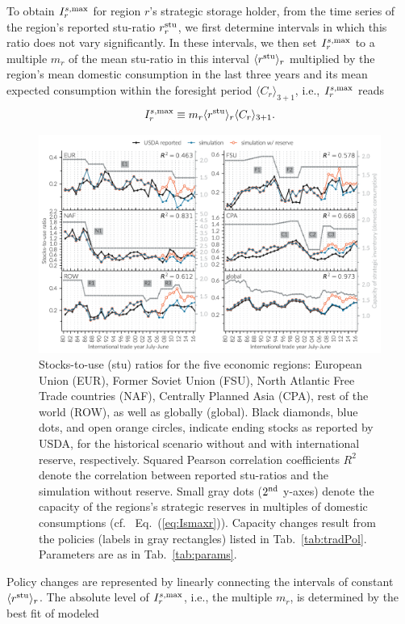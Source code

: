 To obtain $I^{s,\operatorname{max}}_r$ for region $r$'s strategic storage holder, from the time series of the region's
reported stu-ratio $r^{\operatorname{stu}}_r$, we first determine intervals in which this ratio does not vary
significantly. In these intervals, we then set $I^{s,\operatorname{max}}_r$ to a multiple $m_r$ of the mean stu-ratio
in this interval $\langle r^{\operatorname{stu}}\rangle_r$ multiplied by the region's mean domestic consumption in the last three
years and its mean expected consumption within the foresight period $\langle C_r\rangle_{3+1}$,
i.e., $I^{s,\operatorname{max}}_r$ reads
\begin{equation}
  \label{eq:Ismaxr}
  I^{s,\operatorname{max}}_r \equiv m_r\langle r^{\operatorname{stu}}\rangle_r \langle C_r\rangle_{3+1}.
\end{equation}
\begin{figure}[htbp]
  \centering
\includegraphics[width=.8\textwidth]{plots/full/Stocks-to-use_ratio_1980_2017}
\caption{Stocks-to-use (stu) ratios for the five economic regions: European Union (EUR), Former
  Soviet Union (FSU), North Atlantic Free Trade countries (NAF), Centrally Planned Asia (CPA), rest
  of the world (ROW), as well as globally (global). Black diamonds, blue dots, and open orange
  circles, indicate ending stocks as reported by USDA, for the historical scenario without and with
  international reserve, respectively. Squared Pearson correlation coefficients $R^2$ denote the
  correlation between reported stu-ratios and the simulation without reserve. Small gray dots
  ($2^{\operatorname{nd}}$ y-axes) denote the capacity of the regions's strategic reserves in multiples of domestic
  consumptions (cf.~ Eq.~(\ref{eq:Ismaxr})). Capacity changes result from the policies (labels in
  gray rectangles) listed in Tab.~\ref{tab:tradPol}. Parameters are as in Tab.~\ref{tab:params}.}
  \label{fig:stuRatios}
\end{figure}
Policy changes are represented by linearly connecting the intervals of constant $\langle r^{\operatorname{stu}}\rangle_r$. The
absolute level of $I^{s,\operatorname{max}}_r$, i.e., the multiple $m_r$, is determined by the best fit of modeled
